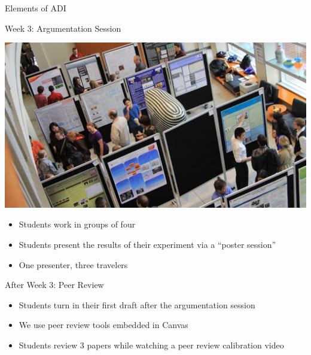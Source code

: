 \documentclass[xcolor=dvipsnames,table]{beamer}
\begin{document}
{\nologo
  \begin{frame}{Elements of ADI}
    \begin{block}{Week 3: Argumentation Session}
      \begin{minipage}{0.2\textwidth}
        \centering \includegraphics[width=\textwidth]{./clipart/posterSession.jpg}
      \end{minipage}\hfill
      \begin{minipage}{0.75\textwidth}
        \begin{itemize}
          \item Students work in groups of four
          \item Students present the results of their experiment via a ``poster session''
          \item One presenter, three travelers
        \end{itemize}
      \end{minipage}
    \end{block}
    \begin{block}{After Week 3: Peer Review}
      \begin{minipage}{0.75\textwidth}
        \begin{itemize}
          \item Students turn in their first draft after the argumentation session
          \item We use peer review tools embedded in Canvas
          \item Students review 3 papers while watching a peer review calibration video
        \end{itemize}
      \end{minipage}\hfill
      \begin{minipage}{0.2\textwidth}

\end{minipage}
\end{block}
\end{frame}}
\end{document}
